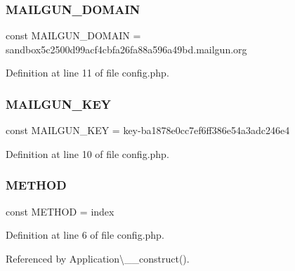 \subsubsection{\texorpdfstring{M\+A\+I\+L\+G\+U\+N\+\_\+\+D\+O\+M\+A\+IN}{MAILGUN\_DOMAIN}}
{\footnotesize\ttfamily const M\+A\+I\+L\+G\+U\+N\+\_\+\+D\+O\+M\+A\+IN = \textquotesingle{}sandbox5c2500d99acf4cbfa26fa88a596a49bd.\+mailgun.\+org\textquotesingle{}}



Definition at line 11 of file config.\+php.

\hypertarget{config_8php_ad320bd8d96c22e094fb9b774f269aaef}{}\label{config_8php_ad320bd8d96c22e094fb9b774f269aaef} 
\subsubsection{\texorpdfstring{M\+A\+I\+L\+G\+U\+N\+\_\+\+K\+EY}{MAILGUN\_KEY}}
{\footnotesize\ttfamily const M\+A\+I\+L\+G\+U\+N\+\_\+\+K\+EY = \textquotesingle{}key-\/ba1878e0cc7ef6ff386e54a3adc246e4\textquotesingle{}}



Definition at line 10 of file config.\+php.

\hypertarget{config_8php_a9d70943cac2f50debb62d2008a6e768d}{}\label{config_8php_a9d70943cac2f50debb62d2008a6e768d} 
\subsubsection{\texorpdfstring{M\+E\+T\+H\+OD}{METHOD}}
{\footnotesize\ttfamily const M\+E\+T\+H\+OD = \textquotesingle{}index\textquotesingle{}}



Definition at line 6 of file config.\+php.



Referenced by Application\textbackslash{}\+\_\+\+\_\+construct().

\hypertarget{config_8php_a75466fbd8ac40be3d3c185c9974118e7}{}\label{config_8php_a75466fbd8ac40be3d3c185c9974118e7} 
